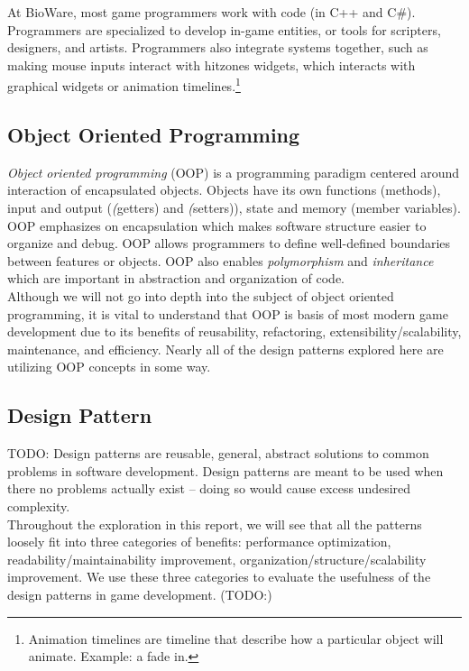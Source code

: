 \documentclass[10pt,letterpaper]{article}
\newcommand{\bs}{\bigskip}
\begin{document}
\begin{multicols}{2}
At BioWare, most game programmers work with code (in C++ and C\#). Programmers are specialized to develop in-game entities, or tools for scripters, designers, and artists. Programmers also integrate systems together, such as making mouse inputs interact with hitzones widgets, which interacts with graphical widgets or animation timelines.\footnote{Animation timelines are timeline that describe how a particular object will animate. Example: a fade in.}

\subsection{Object Oriented Programming}

\textit{Object oriented programming} (OOP) is a programming paradigm centered around interaction of encapsulated objects. Objects have its own functions (methods), input and output (\textit(getters) and \textit(setters)), state and memory (member variables). OOP emphasizes on encapsulation which makes software structure easier to organize and debug. OOP allows programmers to define well-defined boundaries between features or objects. OOP also enables \textit{polymorphism} and \textit{inheritance} which are important in abstraction and organization of code.\cite{oop}\bs
\\
Although we will not go into depth into the subject of object oriented programming, it is vital to understand that OOP is basis of most modern game development due to its benefits of reusability, refactoring, extensibility/scalability, maintenance, and efficiency\cite{oop}. Nearly all of the design patterns explored here are utilizing OOP concepts in some way. 

\subsection{Design Pattern}

TODO:
Design patterns are reusable, general, abstract solutions to common problems in software development.\cite{sm-designpatterns} Design patterns are meant to be used when there no problems actually exist -- doing so would cause excess undesired complexity.\cite{gof}\bs
\\
Throughout the exploration in this report, we will see that all the patterns loosely fit into three categories of benefits: performance optimization, readability/maintainability improvement, organization/structure/scalability improvement. We use these three categories to evaluate the usefulness of the design patterns in game development. (TODO:)


\end{multicols}
\end{document}
